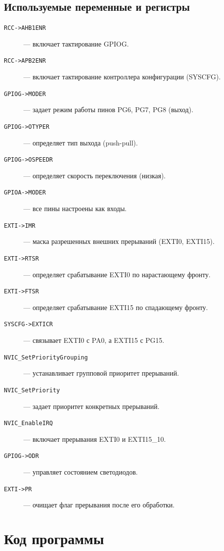 \subsection{Используемые переменные и регистры}
\begin{description}
    \item[\texttt{RCC->AHB1ENR}] — включает тактирование GPIOG.
    \item[\texttt{RCC->APB2ENR}] — включает тактирование контроллера конфигурации (SYSCFG).
    \item[\texttt{GPIOG->MODER}] — задает режим работы пинов PG6, PG7, PG8 (выход).
    \item[\texttt{GPIOG->OTYPER}] — определяет тип выхода (push-pull).
    \item[\texttt{GPIOG->OSPEEDR}] — определяет скорость переключения (низкая).
    \item[\texttt{GPIOA->MODER}] — все пины настроены как входы.
    \item[\texttt{EXTI->IMR}] — маска разрешенных внешних прерываний (EXTI0, EXTI15).
    \item[\texttt{EXTI->RTSR}] — определяет срабатывание EXTI0 по нарастающему фронту.
    \item[\texttt{EXTI->FTSR}] — определяет срабатывание EXTI15 по спадающему фронту.
    \item[\texttt{SYSCFG->EXTICR}] — связывает EXTI0 с PA0, а EXTI15 с PG15.
    \item[\texttt{NVIC\_SetPriorityGrouping}] — устанавливает групповой приоритет прерываний.
    \item[\texttt{NVIC\_SetPriority}] — задает приоритет конкретных прерываний.
    \item[\texttt{NVIC\_EnableIRQ}] — включает прерывания EXTI0 и EXTI15\_10.
    \item[\texttt{GPIOG->ODR}] — управляет состоянием светодиодов.
    \item[\texttt{EXTI->PR}] — очищает флаг прерывания после его обработки.
\end{description}





\newpage

\section*{Код программы}

